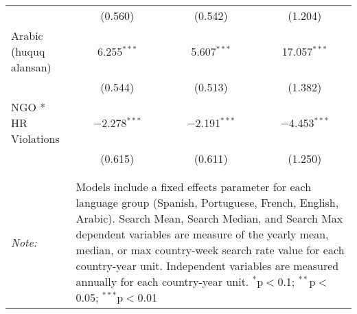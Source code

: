\begin{table}[!htbp]
\begin{tabular}{@{\extracolsep{5pt}}lccc}
  & (0.560) & (0.542) & (1.204) \\ 
  Arabic (huquq alansan) & 6.255$^{***}$ & 5.607$^{***}$ & 17.057$^{***}$ \\ 
  & (0.544) & (0.513) & (1.382) \\ 
  NGO * HR Violations & $-$2.278$^{***}$ & $-$2.191$^{***}$ & $-$4.453$^{***}$ \\ 
  & (0.615) & (0.611) & (1.250) \\ 
 \hline \\[-1.8ex] 
\hline 
\hline \\[-1.8ex] 
\textit{Note:}  & \multicolumn{3}{l}{\parbox[t]{8cm}{Models include a fixed effects parameter for each language group (Spanish, Portuguese, French, English, Arabic). Search Mean, Search Median, and Search Max dependent variables are measure of the yearly mean, median, or max country-week search rate value for each country-year unit. Independent variables are measured annually for each country-year unit. $^{*}$p$<$0.1; $^{**}$p$<$0.05; $^{***}$p$<$0.01}} \\ 
\end{tabular} 
\end{table} 
